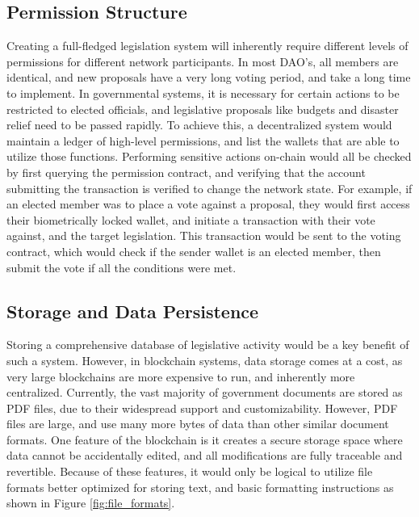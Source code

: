\documentclass[letterpaper,twocolumn]{article}
\begin{document}
\subsection*{Permission Structure}
Creating a full-fledged legislation system will inherently require different levels of permissions for different network participants.  In most DAO's, all members are identical, and new proposals have a very long voting period, and take a long time to implement.  In governmental systems, it is necessary for certain actions to be restricted to elected officials, and legislative proposals like budgets and disaster relief need to be passed rapidly.  To achieve this, a decentralized system would maintain a ledger of high-level permissions, and list the wallets that are able to utilize those functions.  Performing sensitive actions on-chain would all be checked by first querying the permission contract, and verifying that the account submitting the transaction is verified to change the network state.  For example, if an elected member was to place a vote against a proposal, they would first access their biometrically locked wallet, and initiate a transaction with their vote against, and the target legislation.  This transaction would be sent to the voting contract, which would check if the sender wallet is an elected member, then submit the vote if all the conditions were met. 


\subsection*{Storage and Data Persistence}

Storing a comprehensive database of legislative activity would be a key benefit of such a system.  However, in blockchain systems, data storage comes at a cost, as very large blockchains are more expensive to run, and inherently more centralized.  Currently, the vast majority of government documents are stored as PDF files, due to their widespread support and customizability.  However, PDF files are large, and use many more bytes of data than other similar document formats.  One feature of the blockchain is it creates a secure storage space where data cannot be accidentally edited, and all modifications are fully traceable and revertible.  Because of these features, it would only be logical to utilize file formats better optimized for storing text, and basic formatting instructions as shown in Figure \ref{fig:file_formats}.
\end{document}
